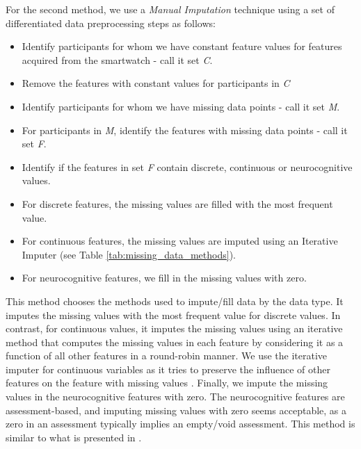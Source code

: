 For the second method, we use a \emph{Manual Imputation} technique using a set of differentiated data preprocessing steps as follows:
\begin{itemize}
 \item Identify participants for whom we have constant feature values for features acquired from the smartwatch - call it set \emph{C}.
 \item Remove the features with constant values for participants in \emph{C}
 \item Identify participants for whom we have missing data points - call it set \emph{M}.
 \item For participants in \emph{M}, identify the features with missing data points - call it set \emph{F}.
 \item Identify if the features in set \emph{F} contain discrete, continuous or neurocognitive values. 
 \item For discrete features, the missing values are filled with the most frequent value.
 \item For continuous features, the missing values are imputed using an Iterative Imputer (see Table \ref{tab:missing_data_methods}).
 \item For neurocognitive features, we fill in the missing values with zero.
\end{itemize}

This method chooses the methods used to impute/fill data by the data type. It imputes the missing values with the most frequent value for discrete values. In contrast, for continuous values, it imputes the missing values using an iterative method that computes the missing values in each feature by considering it as a function of all other features in a round-robin manner. We use the iterative imputer for continuous variables as it tries to preserve the influence of other features on the feature with missing values \cite{buck_method_1960}. Finally, we impute the missing values in the neurocognitive features with zero. The neurocognitive features are assessment-based, and imputing missing values with zero seems acceptable, as a zero in an assessment typically implies an empty/void assessment. This method is similar to what is presented in \cite{shah_personalized_2021}.



